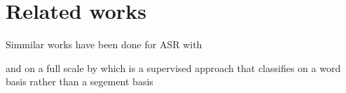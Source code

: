
\chapter{Related works}
\label{ch:relatecworks}
Simmilar works have been done for ASR with \cite{8683086}
\cite{negri-etal-2014-quality}

and on a full scale by 
\cite{le2016automatic} which is a supervised approach that classifies on a word basis rather than a segement basis
